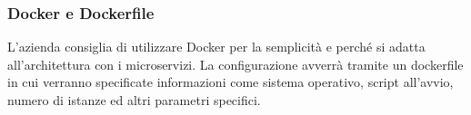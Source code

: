 		\subsubsection{Docker e Dockerfile}
		L'azienda consiglia di utilizzare Docker per la semplicità e perché si adatta all'architettura con i microservizi.
		La configurazione avverrà tramite un dockerfile in cui verranno specificate informazioni come sistema operativo, script all'avvio, numero di istanze ed altri parametri specifici.
